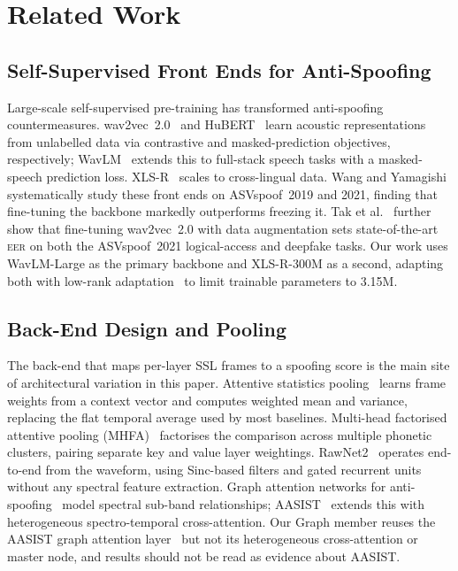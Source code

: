 \documentclass{llncs}
\newcommand{\eer}{\textsc{eer}}
\begin{document}
\section{Related Work}
\label{sec:related}

\subsection{Self-Supervised Front Ends for Anti-Spoofing}

Large-scale self-supervised pre-training has transformed anti-spoofing
countermeasures.  wav2vec~2.0~\cite{wav2vec2} and HuBERT~\cite{hubert} learn
acoustic representations from unlabelled data via contrastive and masked-prediction
objectives, respectively; WavLM~\cite{wavlm} extends this to full-stack speech
tasks with a masked-speech prediction loss.  XLS-R~\cite{xlsr} scales to
cross-lingual data.  Wang and Yamagishi~\cite{wang2021ssl} systematically study
these front ends on ASVspoof~2019 and 2021, finding that fine-tuning the backbone
markedly outperforms freezing it.  Tak et al.~\cite{tak2022wav2vec} further
show that fine-tuning wav2vec~2.0 with data augmentation sets state-of-the-art
\eer{} on both the ASVspoof~2021 logical-access and deepfake tasks.  Our work uses
WavLM-Large as the primary backbone and XLS-R-300M as a second, adapting both with
low-rank adaptation~\cite{lora} to limit trainable parameters to 3.15M.

\subsection{Back-End Design and Pooling}

The back-end that maps per-layer SSL frames to a spoofing score is the main site of
architectural variation in this paper.  Attentive statistics pooling~\cite{attentive_pool}
learns frame weights from a context vector and computes weighted mean and variance,
replacing the flat temporal average used by most baselines.  Multi-head factorised
attentive pooling (MHFA)~\cite{mhfa} factorises the comparison across multiple
phonetic clusters, pairing separate key and value layer weightings.  RawNet2~\cite{rawnet2}
operates end-to-end from the waveform, using Sinc-based filters and gated recurrent
units without any spectral feature extraction.  Graph attention networks for
anti-spoofing~\cite{gat_spoof} model spectral sub-band relationships; AASIST~\cite{aasist}
extends this with heterogeneous spectro-temporal cross-attention.  Our Graph member
reuses the AASIST graph attention layer~\cite{aasist} but not its heterogeneous
cross-attention or master node, and results should not be read as evidence about AASIST.
\end{document}
